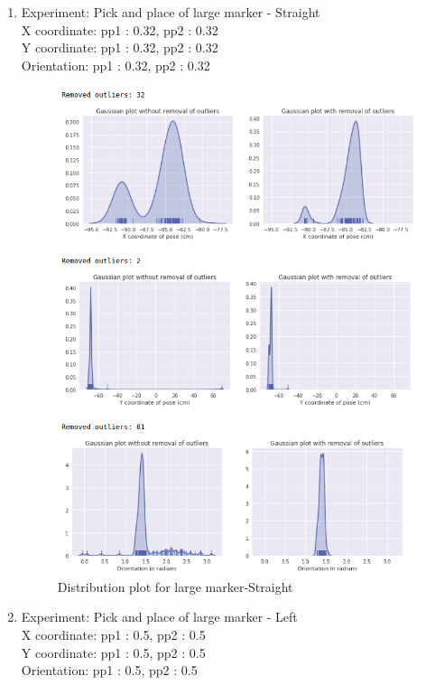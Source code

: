 \documentclass[11pt,a4paper]{article}
\begin{document}
\begin{enumerate}
				\newpage
				\item Experiment: Pick and place of large marker - Straight\\
				X coordinate: pp1 : 0.32, pp2 : 0.32\\
				Y coordinate: pp1 : 0.32, pp2 : 0.32 \\
				Orientation: pp1 : 0.32, pp2 : 0.32
				\begin{figure}[H]
					\centering
					\includegraphics[scale=0.56]{large-str}	
					\caption{Distribution plot for large marker-Straight}
				\end{figure}
				\newpage
				\item Experiment: Pick and place of large marker - Left\\
				X coordinate: pp1 : 0.5, pp2 : 0.5\\
				Y coordinate: pp1 : 0.5, pp2 : 0.5 \\
				Orientation: pp1 : 0.5, pp2 : 0.5
				\begin{figure}[H]

\end{figure}
\end{enumerate}
\end{document}
